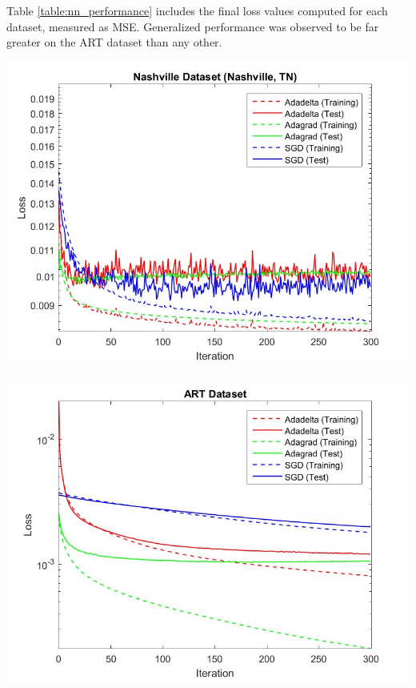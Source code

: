 \documentclass[10pt]{article}
\begin{document}
\begin{multicols}{2}
		Table \ref{table:nn_performance} includes the final loss values computed for each dataset, measured as MSE. Generalized performance was observed to be far greater on the ART dataset than any other.

		\begin{center}
			\captionsetup{type=figure}
			\includegraphics[scale=0.27]{NeuralNet/fig_nn_05} \\
			\label{fig:fig_nn_result4}
		\end{center}

		\begin{center}
            \captionsetup{type=figure}
			\includegraphics[scale=0.27]{NeuralNet/fig_nn_02} \\
			\label{fig:fig_nn_result1}
		\end{center}


\end{multicols}
\end{document}
